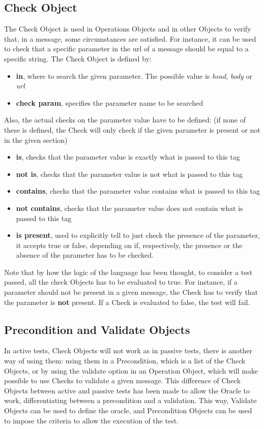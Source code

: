 \subsection{Check Object}
The Check Object is used in Operations Objects and in other Objects to verify that, in a message, some circumstances are satisfied. For instance, it can be used to check that a specific parameter in the url of a message should be equal to a specific string.
The Check Object is defined by:
\begin{itemize}
    \item \textbf{in}, where to search the given parameter. The possible value is \textit{head}, \textit{body} or \textit{url}
    \item \textbf{check param}, specifies the parameter name to be searched
\end{itemize}
Also, the actual checks on the parameter value have to be defined: (if none of these is defined, the Check will only check if the given parameter is present or not in the given section)
\begin{itemize}
    \item \textbf{is}, checks that the parameter value is exactly what is passed to this tag
    \item \textbf{not is}, checks that the parameter value is not what is passed to this tag
    \item \textbf{contains}, checks that the parameter value contains what is passed to this tag 
    \item \textbf{not contains}, checks that the parameter value does not contain what is passed to this tag 
    \item \textbf{is present}, used to explicitly tell to just check the presence of the parameter, it accepts true or false, depending on if, respectively, the presence or the absence of the parameter has to be checked.
\end{itemize}

Note that by how the logic of the language has been thought, to consider a test passed, all the check Objects has to be evaluated to true. For instance, if a parameter should not be present in a given message, the Check has to verify that the parameter is \textbf{not} present. If a Check is evaluated to false, the test will fail.

\subsection{Precondition and Validate Objects}
In active tests, Check Objects will not work as in passive tests, there is another way of using them: using them in a Precondition, which is a list of the Check Objects, or by using the validate option in an Operation Object, which will make possible to use Checks to validate a given message. This difference of Check Objects between active and passive tests has been made to allow the Oracle to work, differentiating between a precondition and a validation. This way, Validate Objects can be used to define the oracle, and Precondition Objects can be used to impose the criteria to allow the execution of the test.
